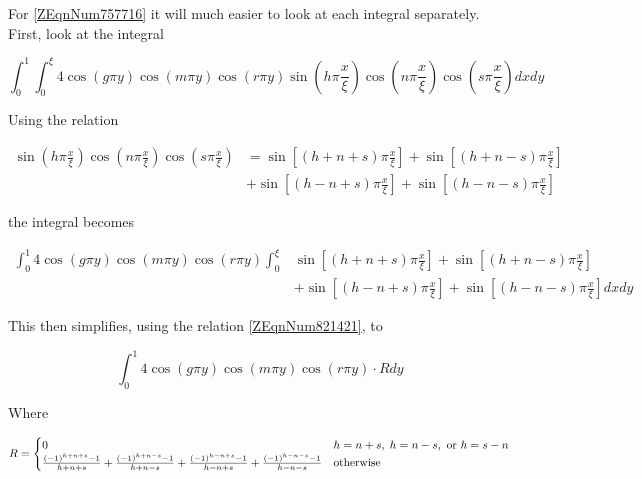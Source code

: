 For \eqref{ZEqnNum757716} it will much easier to look at each integral
separately. First, look at the integral

\begin{equation*}
    \int _{0}^{1} \int _{0}^{\xi }4\cos \left(g\pi y\right)\cos \left(m\pi
    y\right)\cos \left(r\pi y\right)\sin \left(h\pi \frac{x}{\xi } \right)\cos
    \left(n\pi \frac{x}{\xi } \right)\cos \left(s\pi \frac{x}{\xi } \right)dxdy 
\end{equation*}

Using the relation

\begin{equation*} \begin{split}
    \sin \left(h\pi \frac{x}{\xi } \right)\cos \left(n\pi
    \frac{x}{\xi } \right)\cos \left(s\pi \frac{x}{\xi } \right) 
    & = \sin \left[\left(h+n+s\right)\pi \frac{x}{\xi } \right]
    + \sin \left[\left(h+n-s\right)\pi \frac{x}{\xi } \right] \\ 
    & + \sin \left[\left(h-n+s\right)\pi \frac{x}{\xi } \right]
    +\sin \left[\left(h-n-s\right)\pi \frac{x}{\xi } \right]  
\end{split} \end{equation*}

the integral becomes

\begin{equation*} \begin{split}
    \int _{0}^{1} 4 \cos \left(g \pi y\right) \cos \left(m \pi y\right)
    \cos \left(r \pi y\right) \int _{0}^{\xi } 
    &\sin \left[\left(h + n + s\right) \pi \frac{x}{\xi } \right]
    +\sin \left[\left(h+n-s\right)\pi \frac{x}{\xi } \right] \\ 
    & + \sin \left[\left(h - n + s\right)\pi \frac{x}{\xi } \right] 
    + \sin \left[\left(h - n - s\right)\pi \frac{x}{\xi } \right] dxdy 
\end{split} \end{equation*}

This then simplifies, using the relation \eqref{ZEqnNum821421}, to

\begin{equation*}
    \int _{0}^{1} 4\cos \left(g\pi y\right) 
    \cos \left(m\pi y\right)\cos \left(r \pi y\right)\cdot R dy 
\end{equation*}

Where

\begin{equation} \label{ZEqnNum244131} 
    R = \begin{cases} 0 & h = n + s , \; h = n - s, \text{ or } h = s - n \\ \frac{\left(-1\right)^{h + n + s} - 1}{h + n + s} 
        + \frac{\left(-1\right)^{h + n - s} - 1}{h + n - s}
        + \frac{\left(-1\right)^{h - n + s} - 1}{h - n + s} 
        + \frac{\left(-1\right)^{h - n - s} - 1}{h - n - s} & \text{otherwise} \end{cases}
\end{equation}

